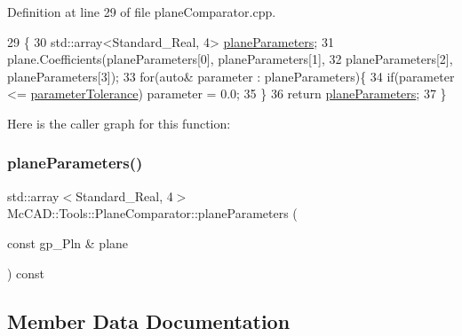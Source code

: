 Definition at line 29 of file plane\+Comparator.\+cpp.


\begin{DoxyCode}
29                                                                    \{
30     std::array<Standard\_Real, 4> \hyperlink{classMcCAD_1_1Tools_1_1PlaneComparator_a1b61d399885072e2af2e3cd03d1ca6c3}{planeParameters};
31     plane.Coefficients(planeParameters[0], planeParameters[1],
32             planeParameters[2], planeParameters[3]);
33     \textcolor{keywordflow}{for}(\textcolor{keyword}{auto}& parameter : planeParameters)\{
34         \textcolor{keywordflow}{if}(parameter <= \hyperlink{classMcCAD_1_1Tools_1_1PlaneComparator_adef35ba390ab77e8e03eadec54a87d5d}{parameterTolerance}) parameter = 0.0;
35     \}
36     \textcolor{keywordflow}{return} \hyperlink{classMcCAD_1_1Tools_1_1PlaneComparator_a1b61d399885072e2af2e3cd03d1ca6c3}{planeParameters};
37 \}
\end{DoxyCode}
Here is the caller graph for this function\+:
\mbox{\label{classMcCAD_1_1Tools_1_1PlaneComparator_a67ad4238f5b52bdd3734710bcd43014c}} 
\subsubsection{\texorpdfstring{plane\+Parameters()}{planeParameters()}\hspace{0.1cm}{\footnotesize\ttfamily [2/2]}}
{\footnotesize\ttfamily std\+::array$<$Standard\+\_\+\+Real, 4$>$ Mc\+C\+A\+D\+::\+Tools\+::\+Plane\+Comparator\+::plane\+Parameters (\begin{DoxyParamCaption}\item[{const gp\+\_\+\+Pln \&}]{plane }\end{DoxyParamCaption}) const\hspace{0.3cm}{\ttfamily [private]}}



\subsection{Member Data Documentation}
\mbox{\label{classMcCAD_1_1Tools_1_1PlaneComparator_a7a12aa43a017dfa6242fc51d87310232}} 
